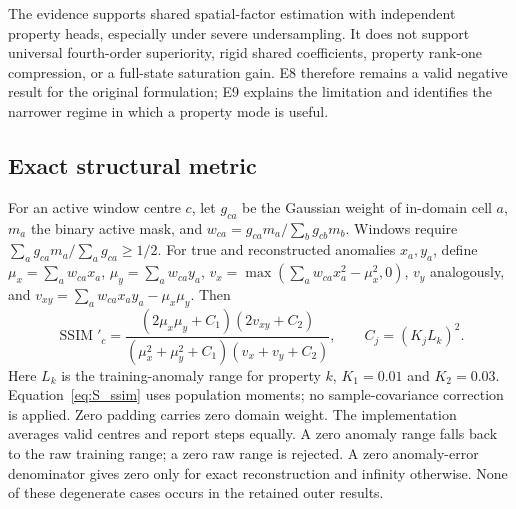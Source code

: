 The evidence supports shared spatial-factor estimation with independent property heads, especially under severe undersampling. It does not support universal fourth-order superiority, rigid shared coefficients, property rank-one compression, or a full-state saturation gain. E8 therefore remains a valid negative result for the original formulation; E9 explains the limitation and identifies the narrower regime in which a property mode is useful.



\subsection{Exact structural metric}
For an active window centre $c$, let $g_{ca}$ be the Gaussian weight of in-domain cell $a$, $m_a$ the binary active mask, and $w_{ca}=g_{ca}m_a/\sum_b g_{cb}m_b$. Windows require $\sum_a g_{ca}m_a/\sum_a g_{ca}\geq 1/2$. For true and reconstructed anomalies $x_a,y_a$, define $\mu_x=\sum_a w_{ca}x_a$, $\mu_y=\sum_a w_{ca}y_a$, $v_x=\max(\sum_a w_{ca}x_a^2-\mu_x^2,0)$, $v_y$ analogously, and $v_{xy}=\sum_a w_{ca}x_ay_a-\mu_x\mu_y$. Then
\begin{equation}
\operatorname{SSIM}'_c=\frac{(2\mu_x\mu_y+C_1)(2v_{xy}+C_2)}{(\mu_x^2+\mu_y^2+C_1)(v_x+v_y+C_2)},\qquad C_j=(K_j L_k)^2.
\label{eq:S_ssim}
\end{equation}
Here $L_k$ is the training-anomaly range for property $k$, $K_1=0.01$ and $K_2=0.03$. Equation~\eqref{eq:S_ssim} uses population moments; no sample-covariance correction is applied. Zero padding carries zero domain weight. The implementation averages valid centres and report steps equally. A zero anomaly range falls back to the raw training range; a zero raw range is rejected. A zero anomaly-error denominator gives zero only for exact reconstruction and infinity otherwise. None of these degenerate cases occurs in the retained outer results.
